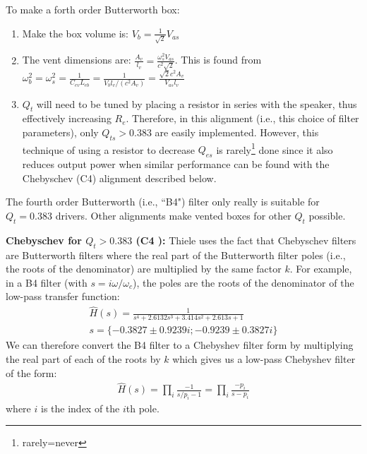 \documentclass[10pt,letterpaper]{book}
\begin{document}
To make a forth order Butterworth box:
\begin{enumerate}
\item Make the box volume is: $V_b=\frac{1}{\sqrt{2}}V_{as}$
\item The vent dimensions are: $\frac{A_v}{l_v}=\frac{\omega_s^2 V_{as}}{c^2\sqrt{2}}$. This is found from $\omega_b^2=\omega_s^2=\frac{1}{C_{ev}L_{eb}}=\frac{1}{V_b l_v/(c^2 A_v)}=\frac{\sqrt{2}c^2 A_v}{V_{as}l_v}$
\item $Q_t$ will need to be tuned by placing a resistor in series with the speaker, thus effectively increasing $R_e$. Therefore, in this alignment (i.e., this choice of filter parameters), only $Q_{ts}>0.383$ are easily implemented. However, this technique of using a resistor to decrease $Q_{es}$ is rarely\footnote{rarely=never} done since it also reduces output power when similar performance can be found with the Chebyschev (C4) alignment described below.
\end{enumerate}

The fourth order Butterworth (i.e., ``B4") filter only really is suitable for $Q_t=0.383$ drivers. Other alignments make vented boxes for other $Q_t$ possible.

\textbf{Chebyschev for $Q_t>0.383$ (C4 ):} Thiele uses the fact that Chebyschev filters are Butterworth filters where the real part of the Butterworth filter poles (i.e., the roots of the denominator) are multiplied by the same factor $k$. For example, in a B4 filter (with $s=i\omega/\omega_c$), the poles are the roots of the denominator of the low-pass transfer function:
\begin{align}
\hat{H}(s)=\frac{1}{
s^4+2.6132s^3+3.414s^2+2.613s+1}\\
s=\{-0.3827\pm 0.9239i;-0.9239 \pm 0.3827i\}\label{eq:cheby_roots}
\end{align}
We can therefore convert the B4 filter to a Chebyshev filter form by multiplying the real part of each of the roots by $k$ which gives us a low-pass Chebyshev filter of the form:
\begin{align}
\hat{H}(s)= \prod_i \frac{-1}{ s/p_i-1 }= \prod_i  \frac{-p_i}{ s-p_i }
\end{align}
where $i$ is the index of the $i$th pole.
\end{document}
